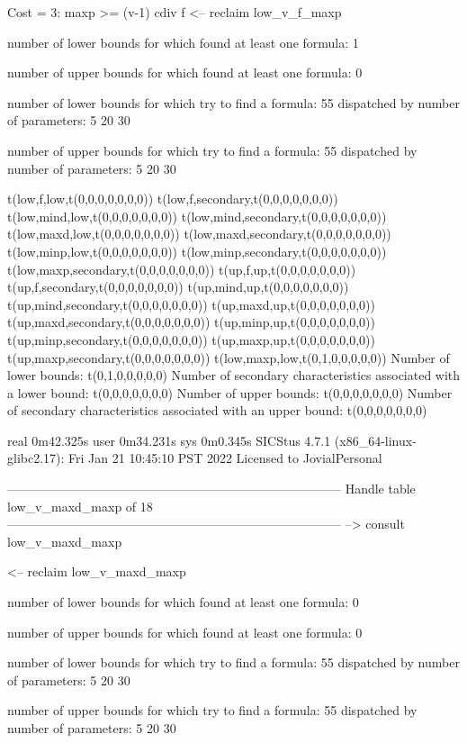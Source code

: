 Cost =  3:  maxp >= (v-1) cdiv f %
<-- reclaim low_v_f_maxp

number of lower bounds for which found at least one formula: 1

number of upper bounds for which found at least one formula: 0

number of lower bounds for which try to find a formula: 55
dispatched by number of parameters: 5  20  30

number of upper bounds for which try to find a formula: 55
dispatched by number of parameters: 5  20  30

t(low,f,low,t(0,0,0,0,0,0,0))
t(low,f,secondary,t(0,0,0,0,0,0,0))
t(low,mind,low,t(0,0,0,0,0,0,0))
t(low,mind,secondary,t(0,0,0,0,0,0,0))
t(low,maxd,low,t(0,0,0,0,0,0,0))
t(low,maxd,secondary,t(0,0,0,0,0,0,0))
t(low,minp,low,t(0,0,0,0,0,0,0))
t(low,minp,secondary,t(0,0,0,0,0,0,0))
t(low,maxp,secondary,t(0,0,0,0,0,0,0))
t(up,f,up,t(0,0,0,0,0,0,0))
t(up,f,secondary,t(0,0,0,0,0,0,0))
t(up,mind,up,t(0,0,0,0,0,0,0))
t(up,mind,secondary,t(0,0,0,0,0,0,0))
t(up,maxd,up,t(0,0,0,0,0,0,0))
t(up,maxd,secondary,t(0,0,0,0,0,0,0))
t(up,minp,up,t(0,0,0,0,0,0,0))
t(up,minp,secondary,t(0,0,0,0,0,0,0))
t(up,maxp,up,t(0,0,0,0,0,0,0))
t(up,maxp,secondary,t(0,0,0,0,0,0,0))
t(low,maxp,low,t(0,1,0,0,0,0,0))
Number of lower bounds:                                             t(0,1,0,0,0,0,0)
Number of secondary characteristics associated with a lower bound:  t(0,0,0,0,0,0,0)
Number of upper bounds:                                             t(0,0,0,0,0,0,0)
Number of secondary characteristics associated with an upper bound: t(0,0,0,0,0,0,0)

real	0m42.325s
user	0m34.231s
sys	0m0.345s
SICStus 4.7.1 (x86_64-linux-glibc2.17): Fri Jan 21 10:45:10 PST 2022
Licensed to JovialPersonal


--------------------------------------------------------------------------------
Handle table low_v_maxd_maxp of 18
--------------------------------------------------------------------------------
--> consult low_v_maxd_maxp

<-- reclaim low_v_maxd_maxp

number of lower bounds for which found at least one formula: 0

number of upper bounds for which found at least one formula: 0

number of lower bounds for which try to find a formula: 55
dispatched by number of parameters: 5  20  30

number of upper bounds for which try to find a formula: 55
dispatched by number of parameters: 5  20  30

